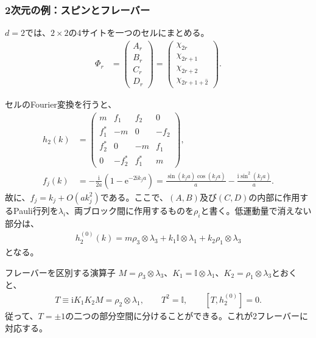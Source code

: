 \documentclass[a4paper,10.5pt]{article}
\numberwithin{equation}{section}
\providecommand{\ii}{\mathrm{i}}
\providecommand{\ee}{\mathrm{e}}
\providecommand{\id}{\mathbb{I}}
\begin{document}
\subsubsection{2次元の例：スピンとフレーバー}
$d=2$では、$2\times2$の4サイトを一つのセルにまとめる。
\begin{align}
\Phi_r&=\begin{pmatrix}A_r\\B_r\\C_r\\D_r\end{pmatrix}
=\begin{pmatrix}
\chi_{2r}\\\chi_{2r+\hat1}\\\chi_{2r+\hat2}\\
\chi_{2r+\hat1+\hat2}
\end{pmatrix}.
\end{align}
\begin{center}
\end{center}
セルのFourier変換を行うと、
\begin{align}
h_2(k)&=\begin{pmatrix}
m&f_1&f_2&0\\
f_1^*&-m&0&-f_2\\
f_2^*&0&-m&f_1\\
0&-f_2^*&f_1^*&m
\end{pmatrix},\\
f_j(k)&=-\frac{\ii}{2a}(1-\ee^{-2\ii k_ja})
=\frac{\sin(k_ja)\cos(k_ja)}a-\frac{\ii\sin^2(k_ja)}a.
\end{align}
故に、$f_j=k_j+O(ak_j^2)$である。ここで、$(A,B)$及び$(C,D)$の内部に作用するPauli行列を$\lambda_i$、両ブロック間に作用するものを$\rho_i$と書く。低運動量で消えない部分は、
\begin{align}
h_2^{(0)}(k)=m\rho_3\otimes\lambda_3
+k_1\id\otimes\lambda_1+k_2\rho_1\otimes\lambda_3
\end{align}
となる。
\begin{resultbox}{フレーバーを区別する演算子}
$M=\rho_3\otimes\lambda_3$、$K_1=\id\otimes\lambda_1$、$K_2=\rho_1\otimes\lambda_3$とおくと、
\begin{align}
T\equiv\ii K_1K_2M=\rho_2\otimes\lambda_1,\qquad
T^2=\id,\qquad[T,h_2^{(0)}]=0.
\end{align}
従って、$T=\pm1$の二つの部分空間に分けることができる。これが2フレーバーに対応する。
\end{resultbox}
\end{document}
